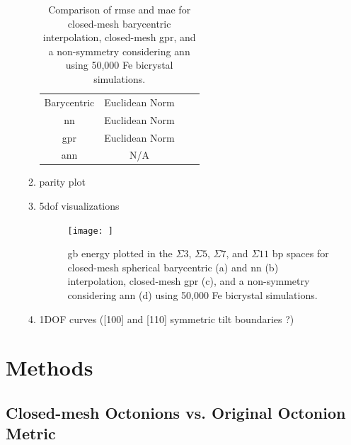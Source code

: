 \documentclass[preprint,12pt]{elsarticle}
\begin{document}
\begin{enumerate}
\begin{enumerate}
\begin{table}[]
\begin{tabular}{c c c c}
                 \hline
                 Barycentric & Euclidean Norm & & \\
                 \acrshort{nn} & Euclidean Norm & & \\
                 \acrshort{gpr} & Euclidean Norm & & \\
                 \acrshort{ann} & N/A & &
            \end{tabular}
            \caption{Comparison of \acrfull{rmse} and \acrfull{mae} for closed-mesh barycentric interpolation, closed-mesh \acrlong{gpr}, and a non-symmetry considering \acrfull{ann} using 50,000 Fe bicrystal simulations.}
            \label{tab:restrepo-comp}
        \end{table}
        \item parity plot
        \item \gls{5dof} visualizations
        \begin{figure}
            \centering
            \texttt{[image: ]}
            \caption{\acrfull{gb} energy plotted in the $\Sigma{3}$, $\Sigma{5}$, $\Sigma{7}$, and $\Sigma{11}$ \acrlong{bp} spaces for closed-mesh spherical barycentric (a) and \acrlong{nn} (b) interpolation, closed-mesh \acrlong{gpr} (c), and a non-symmetry considering \acrlong{ann} (d) using 50,000 Fe bicrystal simulations.}
            \label{fig:restrepo-5dof}
        \end{figure}
        \item 1DOF curves ([100] and [110] symmetric tilt boundaries ?)
    \end{enumerate}
\end{enumerate}

\section{Methods} \label{sec:methods}

\subsection{Closed-mesh Octonions vs. Original Octonion Metric} \label{sec:methods:closed-mesh}
\end{document}
